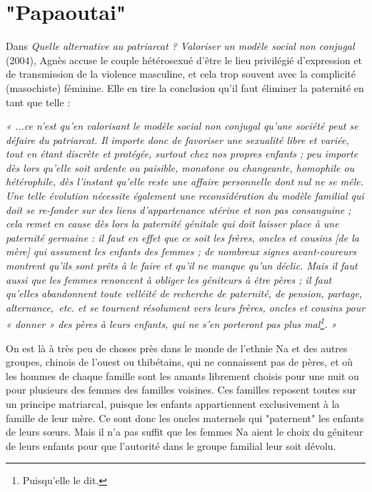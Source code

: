 \chapter{"Papaoutai"} 


 
Dans \emph{Quelle alternative au patriarcat ? Valoriser un modèle social non conjugal} (2004), Agnès  accuse le couple hétérosexué d'être le lieu privilégié d'expression et de transmission de la violence masculine, et cela trop souvent avec la complicité (masochiste) féminine. Elle en tire la conclusion qu'il faut éliminer la paternité en tant que telle :
\begin{displayquote}
\emph{« ...ce n'est qu'en valorisant le modèle social non conjugal qu'une société peut se défaire du patriarcat. Il importe donc de favoriser une sexualité libre et variée, tout en étant discrète et protégée, surtout chez nos propres enfants ; peu importe dès lors qu'elle soit ardente ou paisible, monotone ou changeante, homophile ou hétérophile, dès l'instant qu'elle reste une affaire personnelle dont nul ne se mêle. Une telle évolution nécessite également une reconsidération du modèle familial qui doit se re-fonder sur des liens d'appartenance utérine et non pas consanguine ; cela remet en cause dès lors la paternité génitale qui doit laisser place à une paternité germaine : il faut en effet que ce soit les frères, oncles et cousins [de la mère] qui assument les enfants des femmes ; de nombreux signes avant-coureurs montrent qu'ils sont prêts à le faire et qu'il ne manque qu'un déclic. Mais il faut aussi que les femmes renoncent à obliger les géniteurs à être pères ; il faut qu'elles abandonnent toute velléité de recherche de paternité, de pension, partage, alternance,~etc. et se tournent résolument vers leurs frères, oncles et cousins pour « donner » des pères à leurs enfants, qui ne s'en porteront pas plus mal\footnote{Puisqu'elle le dit.}. »}
\end{displayquote}

On est là à très peu de choses près dans le monde de l'ethnie Na et des autres groupes, chinois de l’ouest ou thibétains, qui ne connaissent pas de pères, et où les hommes de chaque famille sont les amants librement choisis pour une nuit ou pour plusieurs des femmes des familles voisines. Ces familles reposent toutes sur un principe matriarcal, puisque les enfants appartiennent exclusivement à la famille de leur mère. Ce sont donc les oncles maternels qui "paternent" les enfants de leurs sœurs. Mais il n'a pas suffit que les femmes Na aient le choix du géniteur de leurs enfants pour que l'autorité dans le groupe familial leur soit dévolu. 

